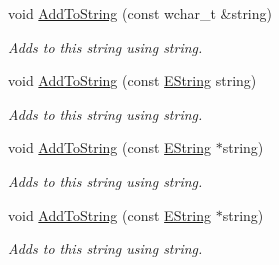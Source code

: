 \begin{DoxyCompactItemize}
void \hyperlink{class_triton_1_1_util_1_1_e_string_a202e6d94a786777671e5f2748dba577b}{Add\+To\+String} (const wchar\+\_\+t \&string)
\begin{DoxyCompactList}\small\item\em Adds to this string using string. \end{DoxyCompactList}\item 
void \hyperlink{class_triton_1_1_util_1_1_e_string_ab10b01f97482f8095a8d8ea484a8720f}{Add\+To\+String} (const \hyperlink{class_triton_1_1_util_1_1_e_string}{E\+String} string)
\begin{DoxyCompactList}\small\item\em Adds to this string using string. \end{DoxyCompactList}\item 
void \hyperlink{class_triton_1_1_util_1_1_e_string_a13ba89e7cd57a1ce67b4c3dc3fa43dcf}{Add\+To\+String} (const \hyperlink{class_triton_1_1_util_1_1_e_string}{E\+String} $\ast$string)
\begin{DoxyCompactList}\small\item\em Adds to this string using string. \end{DoxyCompactList}\item 
void \hyperlink{class_triton_1_1_util_1_1_e_string_a13ba89e7cd57a1ce67b4c3dc3fa43dcf}{Add\+To\+String} (const \hyperlink{class_triton_1_1_util_1_1_e_string}{E\+String} $\ast$string)
\begin{DoxyCompactList}\small\item\em Adds to this string using string. \end{DoxyCompactList}\end{DoxyCompactItemize}
